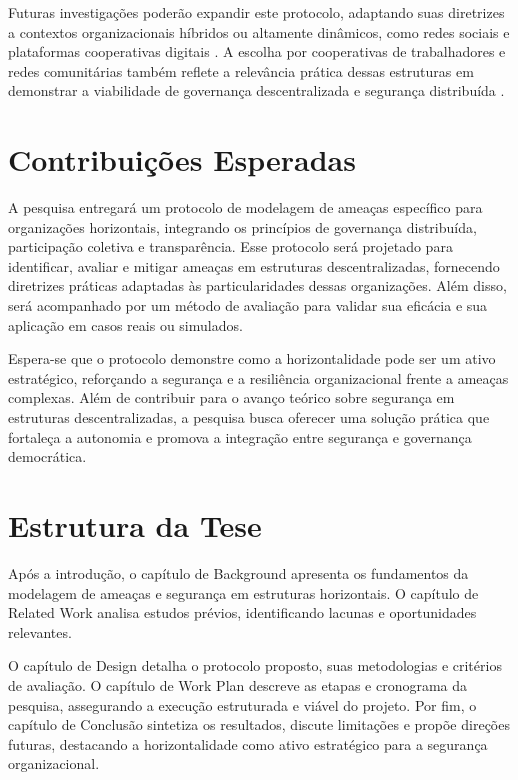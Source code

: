 Futuras investigações poderão expandir este protocolo, adaptando suas
diretrizes a contextos organizacionais híbridos ou altamente dinâmicos,
como redes sociais e plataformas cooperativas digitais
\cite{CreatingTheCollectiveSocialMedia, Non-HierarchicalForms}. A escolha
por cooperativas de trabalhadores e redes comunitárias também reflete a
relevância prática dessas estruturas em demonstrar a viabilidade de
governança descentralizada e segurança distribuída
\cite{WorkerCooperativesinAmerica, EverydayRevolutions}.


\section{Contribuições Esperadas} 
\label{sec:contribuicoes_esperadas}

A pesquisa entregará um protocolo de modelagem de ameaças específico para
organizações horizontais, integrando os princípios de governança distribuída,
participação coletiva e transparência. Esse protocolo será projetado para
identificar, avaliar e mitigar ameaças em estruturas descentralizadas,
fornecendo diretrizes práticas adaptadas às particularidades dessas
organizações. Além disso, será acompanhado por um método de avaliação para
validar sua eficácia e sua aplicação em casos reais ou simulados.

Espera-se que o protocolo demonstre como a horizontalidade pode ser um ativo
estratégico, reforçando a segurança e a resiliência organizacional frente a
ameaças complexas. Além de contribuir para o avanço teórico sobre segurança em
estruturas descentralizadas, a pesquisa busca oferecer uma solução prática que
fortaleça a autonomia e promova a integração entre segurança e governança
democrática.

\section{Estrutura da Tese} 
\label{sec:estrutura_tese}

Após a introdução, o capítulo de Background apresenta os fundamentos
da modelagem de ameaças e segurança em estruturas horizontais. O
capítulo de Related Work analisa estudos prévios, identificando
lacunas e oportunidades relevantes.

O capítulo de Design detalha o protocolo proposto, suas metodologias e
critérios de avaliação. O capítulo de Work Plan descreve as etapas e
cronograma da pesquisa, assegurando a execução estruturada e viável do
projeto. Por fim, o capítulo de Conclusão sintetiza os resultados,
discute limitações e propõe direções futuras, destacando a
horizontalidade como ativo estratégico para a segurança
organizacional.